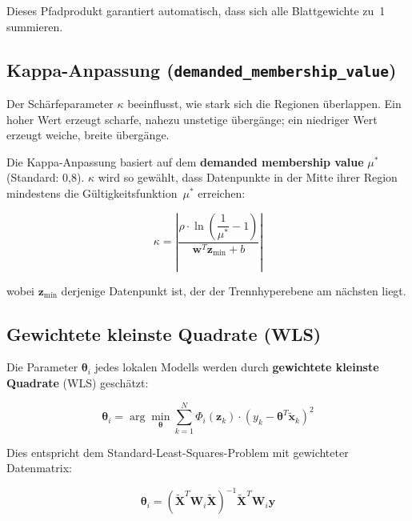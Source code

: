 \documentclass[11pt,a4paper]{report}
\begin{document}
	Dieses Pfadprodukt garantiert automatisch, dass sich alle Blattgewichte zu~1 summieren.
	
	\subsection{Kappa-Anpassung (\texttt{demanded\_membership\_value})}
	
	Der Schärfeparameter $\kappa$ beeinflusst, wie stark sich die Regionen überlappen. Ein hoher Wert erzeugt scharfe, nahezu unstetige übergänge; ein niedriger Wert erzeugt weiche, breite übergänge.
	
	Die Kappa-Anpassung basiert auf dem \textbf{demanded membership value} $\mu^*$ (Standard: 0{,}8). $\kappa$ wird so gewählt, dass Datenpunkte in der Mitte ihrer Region mindestens die Gültigkeitsfunktion~$\mu^*$ erreichen:
	
	\begin{equation}
		\kappa = \left|\frac{\rho \cdot \ln\left(\dfrac{1}{\mu^*} - 1\right)}{\mathbf{w}^T \mathbf{z}_{\min} + b}\right|
	\end{equation}
	
	wobei $\mathbf{z}_{\min}$ derjenige Datenpunkt ist, der der Trennhyperebene am nächsten liegt.
	
	\subsection{Gewichtete kleinste Quadrate (WLS)}
	
	Die Parameter $\boldsymbol{\theta}_i$ jedes lokalen Modells werden durch \textbf{gewichtete kleinste Quadrate} (WLS) geschätzt:
	
	\begin{equation}
		\boldsymbol{\theta}_i = \arg\min_{\boldsymbol{\theta}} \sum_{k=1}^{N} \Phi_i(\mathbf{z}_k) \cdot \left(y_k - \boldsymbol{\theta}^T \tilde{\mathbf{x}}_k\right)^2
	\end{equation}
	
	Dies entspricht dem Standard-Least-Squares-Problem mit gewichteter Datenmatrix:
	
	\begin{equation}
		\boldsymbol{\theta}_i = \left(\tilde{\mathbf{X}}^T \mathbf{W}_i \tilde{\mathbf{X}}\right)^{-1} \tilde{\mathbf{X}}^T \mathbf{W}_i \mathbf{y}
	\end{equation}
	
\end{document}
